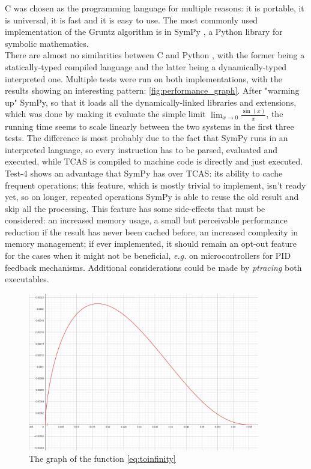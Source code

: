 \documentclass{article}
\theoremstyle{plain}
\theoremstyle{definition}
\begin{document}
	C was chosen as the programming language for multiple reasons: it is portable, it is universal, it is fast and it is easy to use.
	The most commonly used implementation of the Gruntz algorithm is in SymPy \cite{10.7717/peerj-cs.103}, a Python library for symbolic mathematics. \\
	There are almost no similarities between C and Python \cite{book:python}, with the former being a statically-typed \cite{wiki:typesystem} compiled language and the latter being a dynamically-typed \cite{wiki:typesystem} interpreted one. 
	Multiple tests were run on both implementations, with the results showing an interesting pattern: \cref{fig:performance_graph}. After "warming up" SymPy, so that it loads all the dynamically-linked libraries and extensions, which was done by making it evaluate the simple limit \(\lim_{x \to 0}{\frac{\sin(x)}{x}}\), the running time seems to scale linearly between the two systems in the first three tests. The difference is most probably due to the fact that SymPy runs in an interpreted language, so every instruction has to be parsed, evaluated and executed, while TCAS is compiled to machine code is directly and just executed. \\
	Test-4 shows an advantage that SymPy has over TCAS: its ability to cache frequent operations; this feature, which is mostly trivial to implement, isn't ready yet, so on longer, repeated operations SymPy is able to reuse the old result and skip all the processing. This feature has some side-effects that must be considered: an increased memory usage, a small but perceivable performance reduction if the result has never been cached before, an increased complexity in memory management; if ever implemented, it should remain an opt-out feature for the cases when it might not be beneficial, \textit{e.g.} on microcontrollers for PID \cite{wiki:pid} feedback mechanisms.
	Additional considerations could be made by \textit{ptracing} \cite{wiki:ptrace} both executables.
	
	
	\newpage
	\printbibliography
	
	\newpage
	\appendix
	\begin{figure}
		\centering
		\includegraphics[width=0.9\textwidth]{img/limoff1.PNG}
		\caption{The graph of the function \eqref{eq:toinfinity}}\label{fig:limoff1}
	\end{figure}
\end{document}
